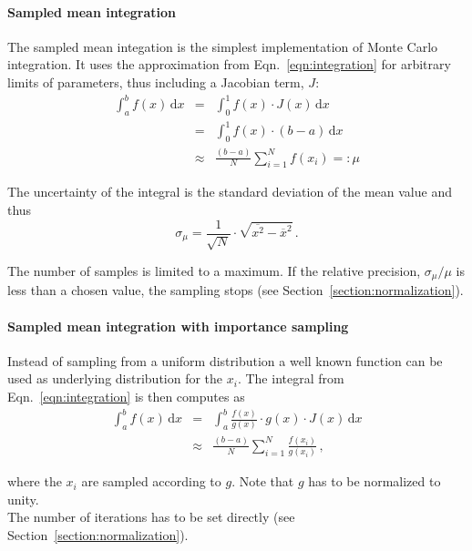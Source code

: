 \documentclass[11pt, a4paper]{article}
\begin{document}
\paragraph{Sampled mean integration} 

The sampled mean integation is the simplest implementation of Monte
Carlo integration. It uses the approximation from
Eqn.~\ref{eqn:integration} for arbitrary limits of parameters, thus
including a Jacobian term, $J$:
%
\begin{eqnarray}
\int_{a}^{b} f(x) \, \mathrm{d}x & = & \int_{0}^{1} f(x) \cdot J(x) \, \mathrm{d}x \\ 
                                 & = & \int_{0}^{1} f(x) \cdot (b - a) \, \mathrm{d}x \\ 
				 & \approx & \frac{(b - a)}{N} \sum_{i=1}^{N} f(x_{i}) =: \mu
\end{eqnarray} 

\noindent 
The uncertainty of the integral is the standard deviation of the mean
value and thus 
%
\begin{equation}
\sigma_{\mu} = \frac{1}{\sqrt{N}} \cdot \sqrt{\overline{x^{2}} - \overline{x}^{2}} \, . 
\end{equation} 

\noindent 
The number of samples is limited to a maximum. If the relative
precision, $\sigma_{\mu}/\mu$ is less than a chosen value, the
sampling stops (see Section~\ref{section:normalization}). 

\paragraph{Sampled mean integration with importance sampling} 

Instead of sampling from a uniform distribution a well known function
can be used as underlying distribution for the $x_{i}$. The integral
from Eqn.~\ref{eqn:integration} is then computes as 
%
\begin{eqnarray}
\int_{a}^{b} f(x) \, \mathrm{d}x & = & \int_{a}^{b} \frac{f(x)}{g(x)} \cdot g(x) \cdot J(x) \, \mathrm{d}x \\ 
 & \approx & \frac{(b - a)}{N} \sum_{i=1}^{N} \frac{f(x_{i})}{g(x_{i})} \, , 
\end{eqnarray} 

\noindent 
where the $x_{i}$ are sampled according to $g$. Note that $g$ has to
be normalized to unity. \\ 

\noindent 
The number of iterations has to be set directly (see Section~\ref{section:normalization}). 
\end{document}

